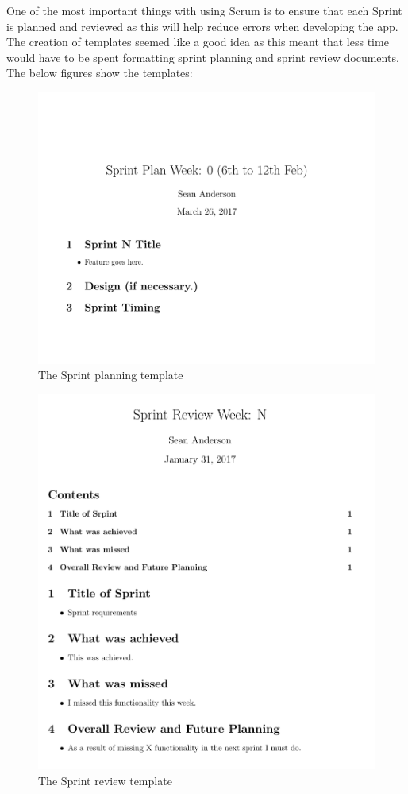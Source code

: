 One of the most important things with using Scrum is to ensure that each Sprint is planned and reviewed as this will help reduce errors when developing the app. The creation of templates seemed like a good idea as this meant that less time would have to be spent formatting sprint planning and sprint review documents. The below figures show the templates:

\begin{figure}
\includegraphics[width=\textwidth,height=\textheight,keepaspectratio]{images/sp}
\caption{The Sprint planning template}
\end{figure}
\begin{figure}
\includegraphics[width=\textwidth,height=\textheight,keepaspectratio]{images/sr}
\caption{The Sprint review template}
\end{figure}


